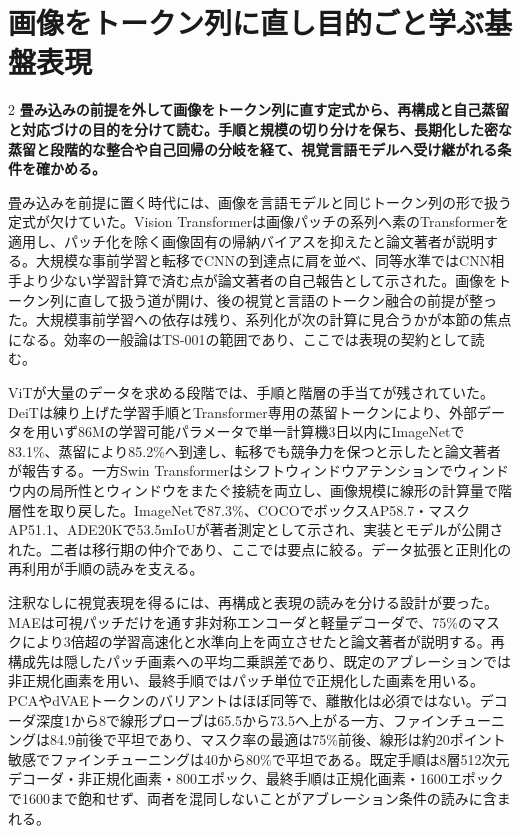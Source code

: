 \documentclass[lualatex,a4paper,10pt]{jlreq}
\begin{document}
\Needspace{0.20\textheight}
\section{画像をトークン列に直し目的ごと学ぶ基盤表現}
\label{sec:p06}
\begin{multicols}{2}
\raggedcolumns
\noindent\textbf{畳み込みの前提を外して画像をトークン列に直す定式から、再構成と自己蒸留と対応づけの目的を分けて読む。手順と規模の切り分けを保ち、長期化した密な蒸留と段階的な整合や自己回帰の分岐を経て、視覚言語モデルへ受け継がれる条件を確かめる。}\autocite{vmd030,vmd034,vmd036}\par\medskip
\noindent 畳み込みを前提に置く時代には、画像を言語モデルと同じトークン列の形で扱う定式が欠けていた。Vision Transformerは画像パッチの系列へ素のTransformerを適用し、パッチ化を除く画像固有の帰納バイアスを抑えたと論文著者が説明する。大規模な事前学習と転移でCNNの到達点に肩を並べ、同等水準ではCNN相手より少ない学習計算で済む点が論文著者の自己報告として示された。画像をトークン列に直して扱う道が開け、後の視覚と言語のトークン融合の前提が整った。大規模事前学習への依存は残り、系列化が次の計算に見合うかが本節の焦点になる。効率の一般論はTS-001の範囲であり、ここでは表現の契約として読む。\autocite{vmd030}\par\medskip
\noindent ViTが大量のデータを求める段階では、手順と階層の手当てが残されていた。DeiTは練り上げた学習手順とTransformer専用の蒸留トークンにより、外部データを用いず86Mの学習可能パラメータで単一計算機3日以内にImageNetで83.1\%、蒸留により85.2\%へ到達し、転移でも競争力を保つと示したと論文著者が報告する。一方Swin Transformerはシフトウィンドウアテンションでウィンドウ内の局所性とウィンドウをまたぐ接続を両立し、画像規模に線形の計算量で階層性を取り戻した。ImageNetで87.3\%、COCOでボックスAP58.7・マスクAP51.1、ADE20Kで53.5mIoUが著者測定として示され、実装とモデルが公開された。二者は移行期の仲介であり、ここでは要点に絞る。データ拡張と正則化の再利用が手順の読みを支える。\autocite{vmd031,vmd032}\par\medskip
\noindent 注釈なしに視覚表現を得るには、再構成と表現の読みを分ける設計が要った。MAEは可視パッチだけを通す非対称エンコーダと軽量デコーダで、75\%のマスクにより3倍超の学習高速化と水準向上を両立させたと論文著者が説明する。再構成先は隠したパッチ画素への平均二乗誤差であり、既定のアブレーションでは非正規化画素を用い、最終手順ではパッチ単位で正規化した画素を用いる。PCAやdVAEトークンのバリアントはほぼ同等で、離散化は必須ではない。デコーダ深度1から8で線形プローブは65.5から73.5へ上がる一方、ファインチューニングは84.9前後で平坦であり、マスク率の最適は75\%前後、線形は約20ポイント敏感でファインチューニングは40から80\%で平坦である。既定手順は8層512次元デコーダ・非正規化画素・800エポック、最終手順は正規化画素・1600エポックで1600まで飽和せず、両者を混同しないことがアブレーション条件の読みに含まれる。\autocite{vmd033}\par\medskip

\end{multicols}
\end{document}
